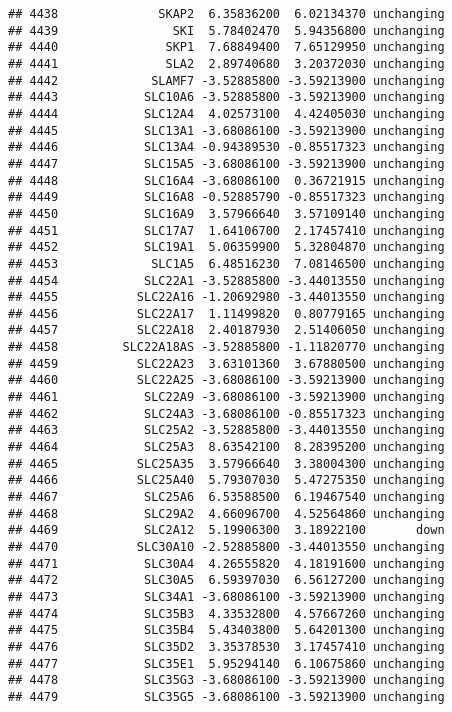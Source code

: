 \documentclass[]{article}
\begin{document}
\begin{verbatim}
## 4438              SKAP2  6.35836200  6.02134370 unchanging
## 4439                SKI  5.78402470  5.94356800 unchanging
## 4440               SKP1  7.68849400  7.65129950 unchanging
## 4441               SLA2  2.89740680  3.20372030 unchanging
## 4442             SLAMF7 -3.52885800 -3.59213900 unchanging
## 4443            SLC10A6 -3.52885800 -3.59213900 unchanging
## 4444            SLC12A4  4.02573100  4.42405030 unchanging
## 4445            SLC13A1 -3.68086100 -3.59213900 unchanging
## 4446            SLC13A4 -0.94389530 -0.85517323 unchanging
## 4447            SLC15A5 -3.68086100 -3.59213900 unchanging
## 4448            SLC16A4 -3.68086100  0.36721915 unchanging
## 4449            SLC16A8 -0.52885790 -0.85517323 unchanging
## 4450            SLC16A9  3.57966640  3.57109140 unchanging
## 4451            SLC17A7  1.64106700  2.17457410 unchanging
## 4452            SLC19A1  5.06359900  5.32804870 unchanging
## 4453             SLC1A5  6.48516230  7.08146500 unchanging
## 4454            SLC22A1 -3.52885800 -3.44013550 unchanging
## 4455           SLC22A16 -1.20692980 -3.44013550 unchanging
## 4456           SLC22A17  1.11499820  0.80779165 unchanging
## 4457           SLC22A18  2.40187930  2.51406050 unchanging
## 4458         SLC22A18AS -3.52885800 -1.11820770 unchanging
## 4459           SLC22A23  3.63101360  3.67880500 unchanging
## 4460           SLC22A25 -3.68086100 -3.59213900 unchanging
## 4461            SLC22A9 -3.68086100 -3.59213900 unchanging
## 4462            SLC24A3 -3.68086100 -0.85517323 unchanging
## 4463            SLC25A2 -3.52885800 -3.44013550 unchanging
## 4464            SLC25A3  8.63542100  8.28395200 unchanging
## 4465           SLC25A35  3.57966640  3.38004300 unchanging
## 4466           SLC25A40  5.79307030  5.47275350 unchanging
## 4467            SLC25A6  6.53588500  6.19467540 unchanging
## 4468            SLC29A2  4.66096700  4.52564860 unchanging
## 4469            SLC2A12  5.19906300  3.18922100       down
## 4470           SLC30A10 -2.52885800 -3.44013550 unchanging
## 4471            SLC30A4  4.26555820  4.18191600 unchanging
## 4472            SLC30A5  6.59397030  6.56127200 unchanging
## 4473            SLC34A1 -3.68086100 -3.59213900 unchanging
## 4474            SLC35B3  4.33532800  4.57667260 unchanging
## 4475            SLC35B4  5.43403800  5.64201300 unchanging
## 4476            SLC35D2  3.35378530  3.17457410 unchanging
## 4477            SLC35E1  5.95294140  6.10675860 unchanging
## 4478            SLC35G3 -3.68086100 -3.59213900 unchanging
## 4479            SLC35G5 -3.68086100 -3.59213900 unchanging

\end{verbatim}
\end{document}
